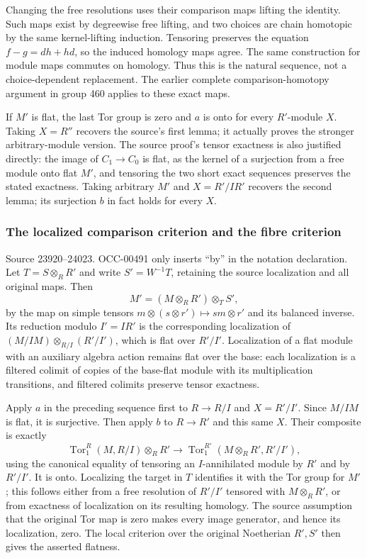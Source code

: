 Changing the free resolutions uses their comparison maps lifting the identity. Such maps exist by degreewise free lifting, and two choices are chain homotopic by the same kernel-lifting induction. Tensoring preserves the equation \(f-g=dh+hd\), so the induced homology maps agree. The same construction for module maps commutes on homology. Thus this is the natural sequence, not a choice-dependent replacement. The earlier complete comparison-homotopy argument in group 460 applies to these exact maps.

If \(M'\) is flat, the last Tor group is zero and \(a\) is onto for every \(R'\)-module \(X\). Taking \(X=R''\) recovers the source's first lemma; it actually proves the stronger arbitrary-module version. The source proof's tensor exactness is also justified directly: the image of \(C_1\to C_0\) is flat, as the kernel of a surjection from a free module onto flat \(M'\), and tensoring the two short exact sequences preserves the stated exactness. Taking arbitrary \(M'\) and \(X=R'/IR'\) recovers the second lemma; its surjection \(b\) in fact holds for every \(X\).

\subsubsection{The localized comparison criterion and the fibre criterion}\label{the-localized-comparison-criterion-and-the-fibre-criterion}

Source 23920--24023. OCC-00491 only inserts ``by'' in the notation declaration. Let \(T=S\otimes_RR'\) and write \(S'=W^{-1}T\), retaining the source localization and all original maps. Then \[
M'=(M\otimes_RR')\otimes_T S',
\] by the map on simple tensors \(m\otimes(s\otimes r')\mapsto sm\otimes r'\) and its balanced inverse. Its reduction modulo \(I'=IR'\) is the corresponding localization of \((M/IM)\otimes_{R/I}(R'/I')\), which is flat over \(R'/I'\). Localization of a flat module with an auxiliary algebra action remains flat over the base: each localization is a filtered colimit of copies of the base-flat module with its multiplication transitions, and filtered colimits preserve tensor exactness.

Apply \(a\) in the preceding sequence first to \(R\to R/I\) and \(X=R'/I'\). Since \(M/IM\) is flat, it is surjective. Then apply \(b\) to \(R\to R'\) and this same \(X\). Their composite is exactly \[
\operatorname{Tor}_1^R(M,R/I)\otimes_R R'
 \longrightarrow \operatorname{Tor}_1^{R'}(M\otimes_RR',R'/I'),
\] using the canonical equality of tensoring an \(I\)-annihilated module by \(R'\) and by \(R'/I'\). It is onto. Localizing the target in \(T\) identifies it with the Tor group for \(M'\); this follows either from a free resolution of \(R'/I'\) tensored with \(M\otimes_RR'\), or from exactness of localization on its resulting homology. The source assumption that the original Tor map is zero makes every image generator, and hence its localization, zero. The local criterion over the original Noetherian \(R',S'\) then gives the asserted flatness.

